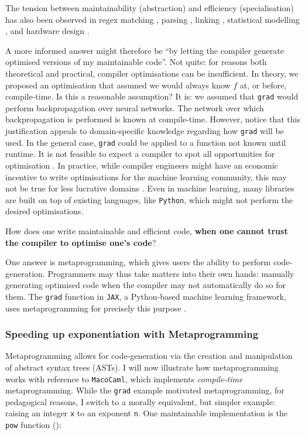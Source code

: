 The tension between maintainability (abstraction) and efficiency (specialisation) has also been observed in regex matching \citep{tratt-2008}, parsing \citep{yallop-2023}, linking \citep{servetto-2013}, statistical modelling \citep{wickham-2019}, and hardware design \citep{vandebon-2021}.

A more informed answer might therefore be ``by letting the compiler generate optimised versions of my maintainable code''. Not quite: for reasons both theoretical and practical, compiler optimisations can be insufficient. In theory, we proposed an optimisation that assumed we would always know $f$ at, or before, compile-time. Is this a reasonable assumption? It is: we assumed that \texttt{grad} would perform backpropagation over neural networks. The network over which backpropagation is performed is known at compile-time. However, notice that this justification appeals to domain-specific knowledge regarding how \texttt{grad} will be used. In the general case, \texttt{grad} could be applied to a function not known until runtime. It is not feasible to expect a compiler to spot all opportunities for optimisation \citep{rice-53}. In practice, while compiler engineers might have an economic incentive to write optimisations for the machine learning community, this may not be true for less lucrative domains \citep{robinson-01}. Even in machine learning, many libraries are built on top of existing languages, like \texttt{Python}, which might not perform the desired optimisations.

How does one write maintainable and efficient code, \textbf{when one cannot trust the compiler to optimise one's code}?

One answer is metaprogramming, which gives users the ability to perform code-generation. Programmers may thus take matters into their own hands: manually generating optimised code when the compiler may not automatically do so for them. The \texttt{grad} function in \texttt{JAX}, a Python-based machine learning framework, uses metaprogramming for precisely this purpose \citep{jax-grad-metaprogramming}.

\subsubsection{Speeding up exponentiation with Metaprogramming}
Metaprogramming allows for code-generation via the creation and manipulation of abstract syntax trees (ASTs). I will now illustrate how metaprogramming works with reference to \texttt{MacoCaml}, which implements \textit{compile-time} metaprogramming. While the \texttt{grad} example motivated metaprogramming, for pedagogical reasons, I switch to a morally equivalent, but simpler example: raising an integer \texttt{x} to an exponent \texttt{n}. One maintainable implementation is the \texttt{pow} function ():

